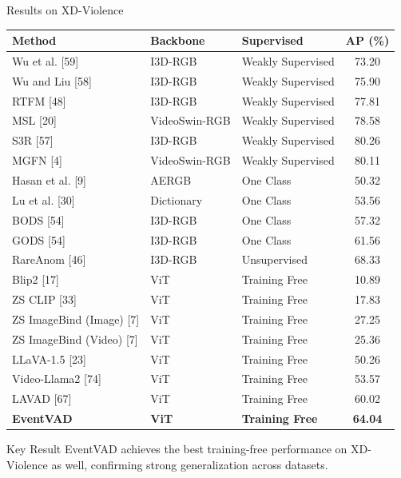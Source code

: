 \documentclass[aspectratio=169,xcolor=dvipsnames]{beamer}
\begin{document}
	
	\begin{frame}{Results on XD-Violence}
		\scriptsize
		
		\begin{table}
			\centering
			\setlength{\tabcolsep}{4pt}
			\renewcommand{\arraystretch}{1.12}
			\begin{tabular}{l l l c}
				\hline
				\textbf{Method} & \textbf{Backbone} & \textbf{Supervised} & \textbf{AP (\%)} \\
				\hline
				Wu et al. [59] & I3D-RGB & Weakly Supervised & 73.20 \\
				Wu and Liu [58] & I3D-RGB & Weakly Supervised & 75.90 \\
				RTFM [48] & I3D-RGB & Weakly Supervised & 77.81 \\
				MSL [20] & VideoSwin-RGB & Weakly Supervised & 78.58 \\
				S3R [57] & I3D-RGB & Weakly Supervised & 80.26 \\
				MGFN [4] & VideoSwin-RGB & Weakly Supervised & 80.11 \\
				\hline
				Hasan et al. [9] & AERGB & One Class & 50.32 \\
				Lu et al. [30] & Dictionary & One Class & 53.56 \\
				BODS [54] & I3D-RGB & One Class & 57.32 \\
				GODS [54] & I3D-RGB & One Class & 61.56 \\
				\hline
				RareAnom [46] & I3D-RGB & Unsupervised & 68.33 \\
				\hline
				Blip2 [17] & ViT & Training Free & 10.89 \\
				ZS CLIP [33] & ViT & Training Free & 17.83 \\
				ZS ImageBind (Image) [7] & ViT & Training Free & 27.25 \\
				ZS ImageBind (Video) [7] & ViT & Training Free & 25.36 \\
				LLaVA-1.5 [23] & ViT & Training Free & 50.26 \\
				Video-Llama2 [74] & ViT & Training Free & 53.57 \\
				LAVAD [67] & ViT & Training Free & 60.02 \\
				\textbf{EventVAD} & \textbf{ViT} & \textbf{Training Free} & \textbf{64.04} \\
				\hline
			\end{tabular}
		\end{table}
		
		\vspace{-0.4em}
		\begin{block}{Key Result}
			EventVAD achieves the best training-free performance on XD-Violence as well, confirming strong generalization across datasets.
		\end{block}
		
	\end{frame}
	
\end{document}
